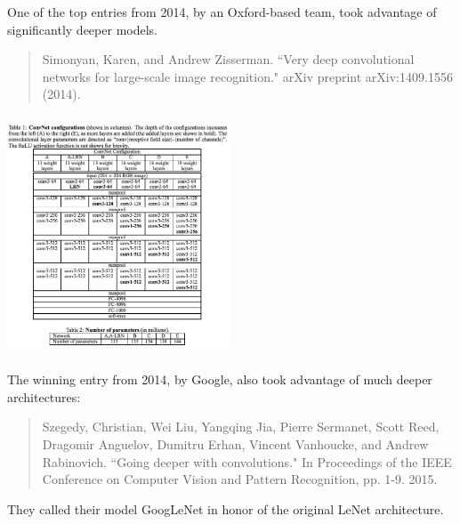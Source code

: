 \documentclass[xetex,mathserif,serif,aspectratio=169]{beamer}
\begin{document}
\begin{frame}[fragile] \frametitle{} \oldB \small


One of the top entries from 2014, by an Oxford-based team, took
advantage of significantly deeper models.
\begin{quote}
Simonyan, Karen, and Andrew Zisserman. ``Very deep convolutional networks for large-scale image recognition." arXiv preprint arXiv:1409.1556 (2014).
\end{quote}

\end{frame}

\begin{frame}[fragile] \frametitle{} \oldB \small

\begin{center}
\includegraphics[width=0.5\textwidth]{img/vggModel.jpg}
\end{center}

\end{frame}

\begin{frame}[fragile] \frametitle{} \oldB \small

\textbf{}

\end{frame}

\begin{frame}[fragile] \frametitle{} \oldB \small


The winning entry from 2014, by Google, also took advantage
of much deeper architectures:
\begin{quote}
Szegedy, Christian, Wei Liu, Yangqing Jia, Pierre Sermanet, Scott Reed, Dragomir Anguelov, Dumitru Erhan, Vincent Vanhoucke, and Andrew Rabinovich. ``Going deeper with convolutions." In Proceedings of the IEEE Conference on Computer Vision and Pattern Recognition, pp. 1-9. 2015.
\end{quote}
They called their model GoogLeNet in honor of the original LeNet
architecture.

\end{frame}
\end{document}
